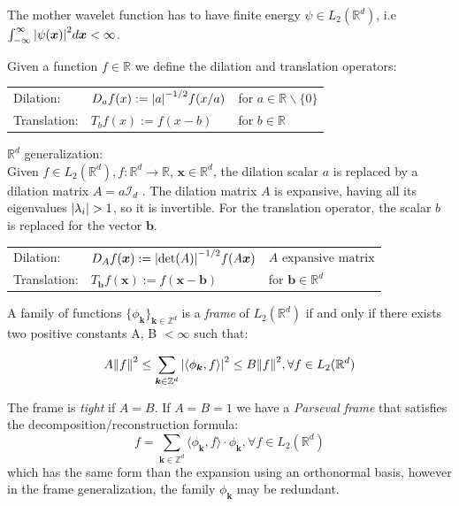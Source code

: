 The mother wavelet function has to have finite energy $\psi \in L_2(\mathbb{R}^d)$, i.e $\int_{-\infty}^{\infty}\abs{\psi(\bm{x})}^2 d\bm{x} < \infty $.\newline

\begin{definition}\label{def:D_T}
  Given a function $f\in\mathbb{R}$ we define the dilation and translation operators\cite{heil_continuous_1989}:\par
  \begin{tabular}{lll}
    Dilation:&  $D_a f(x):=\abs{a}^{-1/2}f(x/a)$ &for $a \in \mathbb{R}\backslash\{0\}$ \\
    Translation:&   $T_b f(x):=f(x-b)$ &for $b \in \mathbb{R}$ \\
  \end{tabular}

  $\mathbb{R}^d$ generalization:\\
  Given $f \in L_2(\mathbb{R}^d), f:\mathbb{R}^d \rightarrow \mathbb{R}$, $\bm{x}\in\mathbb{R}^d$, the dilation scalar $a$ is replaced by a dilation matrix $A = a \mathcal{I}_d$ \cite{qian_wavelet_2007}. The dilation matrix $A$ is expansive, having all its eigenvalues $\abs{\lambda_i} > 1$, so it is invertible. For the translation operator, the scalar $b$ is replaced for the vector $\bm{b}$.\par
  \begin{tabular}{lll}
    Dilation:& $D_A f(\bm{x}):=\abs{\det(A)}^{-1/2}f(A\bm{x})$ &$A \text{ expansive matrix}$\\
    Translation:&   $T_{\bm{b}} f(\bm{x}):=f(\bm{x}-\bm{b})$ &for $\bm{b} \in \mathbb{R}^d$ \\
  \end{tabular}
\end{definition}

\begin{definition}[Frame]\label{def:frame}
    A family of functions $\{\phi_{\bm{k}}\}_{ \bm{k}\in\mathbb{Z}^d}$ is a \textit{frame} of $L_2(\mathbb{R}^d)$ if and only if there exists two positive constants A, B $< \infty$ such that:

\begin{equation}
  A\norm{f}^2 \le \sum_{\bm{k}\in\mathbb{Z}^d}\abs{\langle\phi_{\bm{k}},f\rangle}^2 \le B\norm{f}^2, \forall f \in L_2(\mathbb{R}^d)
\end{equation}

The frame is \textit{tight} if $A=B$. If $A=B=1$ we have a \textit{Parseval frame} that satisfies the decomposition/reconstruction formula:
\begin{equation}
  f = \sum_{\bm{k}\in\mathbb{Z}^d}\langle\phi_{\bm{k}},f\rangle \cdot \phi_{\bm{k}}, \forall f \in L_2(\mathbb{R}^d)
\end{equation}
which has the same form than the expansion using an orthonormal basis, however in the frame generalization, the family $\phi_{\bm{k}}$ may be redundant.
\end{definition}

